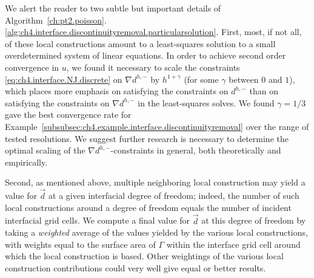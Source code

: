 We alert the reader to two subtle but important details of Algorithm~\ref{ch:pt2.poisson}.\ref{alg:ch4.interface.discontinuityremoval.particularsolution}. First, most, if not all, of these local constructions amount to a least-squares solution to a small overdetermined system of linear equations. In order to achieve second order convergence in $u$, we found it necessary to scale the constraints \eqref{eq:ch4.interface.NJ.discrete} on $\nabla d^{h,-}$ by $h^{1+\gamma}$ (for some $\gamma$ between $0$ and $1$), which places more emphasis on satisfying the constraints on $d^{h,-}$ than on satisfying the constraints on $\nabla d^{h,-}$ in the least-squares solves. We found $\gamma = 1/3$ gave the best convergence rate for Example~\ref{subsubsec:ch4.example.interface.discontinuityremoval} over the range of tested resolutions. We suggest further research is necessary to determine the optimal scaling of the $\nabla d^{h,-}$-constraints in general, both theoretically and empirically.

Second, as mentioned above, multiple neighboring local construction may yield a value for $\vec{d}$ at a given interfacial degree of freedom; indeed, the number of such local constructions around a degree of freedom equals the number of incident interfacial grid cells. We compute a final value for $\vec{d}$ at this degree of freedom by taking a \emph{weighted} average of the values yielded by the various local constructions, with weights equal to the surface area of $\Gamma$ within the interface grid cell around which the local construction is based. Other weightings of the various local construction contributions could very well give equal or better results.

